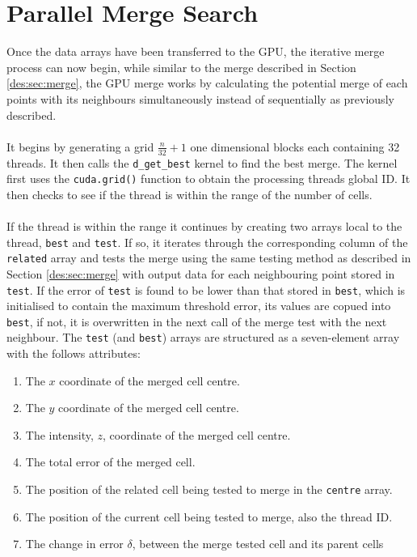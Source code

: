 \section{Parallel Merge Search}
Once the data arrays have been transferred to the GPU, the iterative merge process can now begin, while similar to the merge described in Section \ref{des:sec:merge}, the GPU merge works by calculating the potential merge of each points with its neighbours simultaneously instead of sequentially as previously described.
\\
\\
It begins by generating a grid $\frac{n}{32}+1$ one dimensional blocks each containing 32 threads. It then calls the \texttt{d\_get\_best} kernel to find the best merge. The kernel first uses the \texttt{cuda.grid()} function to obtain the processing threads global ID. It then checks to see if the thread is within the range of the number of cells.
\\
\\
If the thread is within the range it continues by creating two arrays local to the thread, \texttt{best} and \texttt{test}. If so, it iterates through the corresponding column of the \texttt{related} array and tests the merge using the same testing method as described in Section \ref{des:sec:merge} with output data for each neighbouring point stored in \texttt{test}. If the error of \texttt{test} is found to be lower than that stored in \texttt{best}, which is initialised to contain the maximum threshold error, its values are copued into \texttt{best}, if not, it is overwritten in the next call of the merge test with the next neighbour. The \texttt{test} (and \texttt{best}) arrays are structured as a seven-element array with the follows attributes:
\begin{enumerate}
\item The $x$ coordinate of the merged cell centre.
\item The $y$ coordinate of the merged cell centre.
\item The intensity, $z$, coordinate of the merged cell centre.
\item The total error of the merged cell.
\item The position of the related cell being tested to merge in the \texttt{centre} array.
\item The position of the current cell being tested to merge, also the thread ID.
\item The change in error $\delta$, between the merge tested cell and its parent cells
\end{enumerate}
